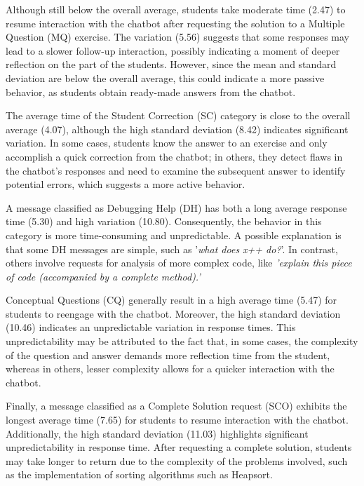 \documentclass[a4paper,twoside]{article}
\begin{document}
Although still below the overall average, students take moderate time (2.47) to
resume interaction with the chatbot after requesting the solution to a Multiple
Question (MQ) exercise. The variation (5.56) suggests that some responses may
lead to a slower follow-up interaction, possibly indicating a moment of deeper
reflection on the part of the students. However, since the mean and standard
deviation are below the overall average, this could indicate a more passive
behavior, as students obtain ready-made answers from the chatbot.

The average time of the Student Correction (SC) category is close to the overall
average (4.07), although the high standard deviation (8.42) indicates
significant variation. In some cases, students know the answer to an exercise
and only accomplish a quick correction from the chatbot; in others, they detect
flaws in the chatbot's responses and need to examine the subsequent answer to
identify potential errors, which suggests a more active behavior.

A message classified as Debugging Help (DH) has both a long average response
time (5.30) and high variation (10.80). Consequently, the behavior in this
category is more time-consuming and unpredictable. A possible explanation is
that some DH messages are simple, such as '\textit{what does x++ do?}'. In
contrast, others involve requests for analysis of more complex code, like
\textit{'explain this piece of code (accompanied by a complete method).'}

Conceptual Questions (CQ) generally result in a high average time (5.47) for
students to reengage with the chatbot. Moreover, the high standard deviation
(10.46) indicates an unpredictable variation in response times. This
unpredictability may be attributed to the fact that, in some cases, the
complexity of the question and answer demands more reflection time from the
student, whereas in others, lesser complexity allows for a quicker interaction
with the chatbot.

Finally, a message classified as a Complete Solution request (SCO) exhibits the
longest average time (7.65) for students to resume interaction with the chatbot.
Additionally, the high standard deviation (11.03) highlights significant
unpredictability in response time. After requesting a complete solution,
students may take longer to return due to the complexity of the problems
involved, such as the implementation of sorting algorithms such as Heapsort.
\end{document}
